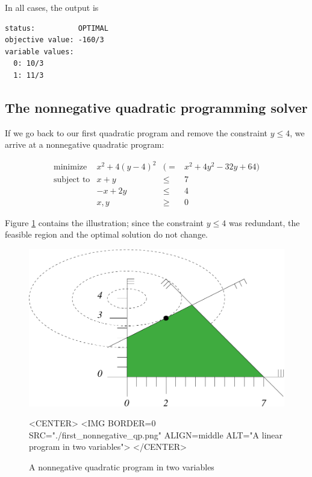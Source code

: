 In all cases, the output is
\begin{verbatim}
status:          OPTIMAL
objective value: -160/3
variable values:
  0: 10/3
  1: 11/3
\end{verbatim}

\subsection{The  nonnegative quadratic programming solver}
If we go back to our first quadratic program and
remove the constraint $y\leq 4$, we arrive at a nonnegative quadratic
program: 

\[
\begin{array}{lrcl}
\mbox{minimize}       & x^2 + 4(y-4)^2 &(=& x^2 + 4y^2 - 32y + 64) \\
\mbox{subject to}     & x + y &\leq& 7 \\
                      & -x + 2y &\leq& 4 \\
                      & x,y &\geq& 0
\end{array}
\]

Figure \ref{fig:QP-first_nonnegative_qp} contains 
the illustration; since the constraint $y\leq 4$ was 
redundant, the feasible region and the optimal solution do 
not change. 

\begin{figure}[htbp]
\begin{ccTexOnly}
\begin{center}
\includegraphics{QP_solver/first_nonnegative_qp} 
\end{center}
\end{ccTexOnly}

\begin{ccHtmlOnly}
<CENTER>
<IMG BORDER=0 SRC="./first_nonnegative_qp.png" ALIGN=middle ALT="A linear program in two variables">
</CENTER>
\end{ccHtmlOnly}

\caption{A nonnegative quadratic program in two variables
\label{fig:QP-first_nonnegative_qp}}
\end{figure}

